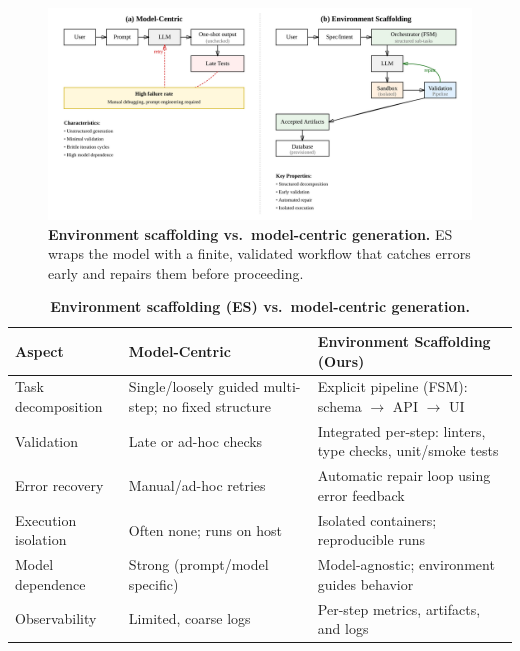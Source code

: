 \documentclass{article}
\begin{document}
\begin{figure}[t]
  \centering
  \includegraphics[width=\linewidth]{diagrams/es-vs-model.png}
  \vspace{-0.5em}
  \caption{\textbf{Environment scaffolding vs.\ model-centric generation.} ES wraps the model with a finite, validated workflow that catches errors early and repairs them before proceeding.}
  \label{fig:es-vs-model}
\end{figure}

\begin{table}[t]
\centering
\small
\begin{threeparttable}
\caption{\textbf{Environment scaffolding (ES) vs.\ model-centric generation.}}
\label{tab:es-contrast}
\begin{tabular}{@{}p{3.2cm}p{5.6cm}p{5.6cm}@{}}
\toprule
\textbf{Aspect} & \textbf{Model-Centric} & \textbf{Environment Scaffolding (Ours)} \\
\midrule
Task decomposition & Single/loosely guided multi-step; no fixed structure &
Explicit pipeline (FSM): schema $\rightarrow$ API $\rightarrow$ UI \\
Validation & Late or ad-hoc checks &
Integrated per-step: linters, type checks, unit/smoke tests \\
Error recovery & Manual/ad-hoc retries &
Automatic repair loop using error feedback \\
Execution isolation & Often none; runs on host &
Isolated containers; reproducible runs \\
Model dependence & Strong (prompt/model specific) &
Model-agnostic; environment guides behavior \\
Observability & Limited, coarse logs &
Per-step metrics, artifacts, and logs \\
\bottomrule
\end{tabular}
\end{threeparttable}
\end{table}
\end{document}
